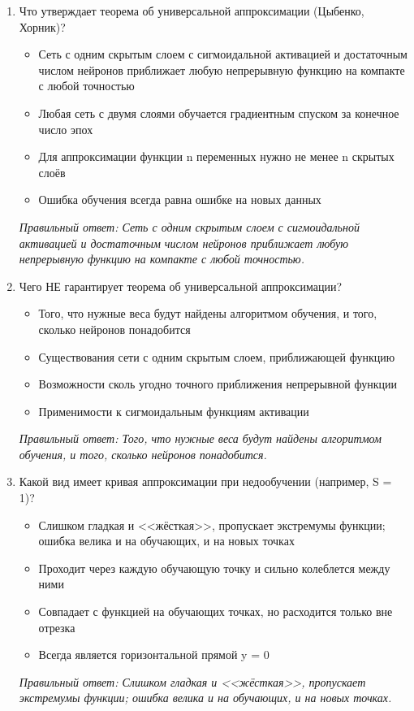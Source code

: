 \begin{enumerate}[label=\textbf{\arabic*.}, leftmargin=0pt, itemsep=1.2em]
\item Что утверждает теорема об универсальной аппроксимации (Цыбенко, Хорник)?
\begin{itemize}[label=$\square$, leftmargin=1.5cm, itemsep=0.2em, topsep=0.3em]
\item Сеть с одним скрытым слоем с сигмоидальной активацией и достаточным числом нейронов приближает любую непрерывную функцию на компакте с любой точностью
\item Любая сеть с двумя слоями обучается градиентным спуском за конечное число эпох
\item Для аппроксимации функции n переменных нужно не менее n скрытых слоёв
\item Ошибка обучения всегда равна ошибке на новых данных
\end{itemize}
{\small\textit{Правильный ответ: Сеть с одним скрытым слоем с сигмоидальной активацией и достаточным числом нейронов приближает любую непрерывную функцию на компакте с любой точностью.}}

\item Чего НЕ гарантирует теорема об универсальной аппроксимации?
\begin{itemize}[label=$\square$, leftmargin=1.5cm, itemsep=0.2em, topsep=0.3em]
\item Того, что нужные веса будут найдены алгоритмом обучения, и того, сколько нейронов понадобится
\item Существования сети с одним скрытым слоем, приближающей функцию
\item Возможности сколь угодно точного приближения непрерывной функции
\item Применимости к сигмоидальным функциям активации
\end{itemize}
{\small\textit{Правильный ответ: Того, что нужные веса будут найдены алгоритмом обучения, и того, сколько нейронов понадобится.}}

\item Какой вид имеет кривая аппроксимации при недообучении (например, S = 1)?
\begin{itemize}[label=$\square$, leftmargin=1.5cm, itemsep=0.2em, topsep=0.3em]
\item Слишком гладкая и <<жёсткая>>, пропускает экстремумы функции; ошибка велика и на обучающих, и на новых точках
\item Проходит через каждую обучающую точку и сильно колеблется между ними
\item Совпадает с функцией на обучающих точках, но расходится только вне отрезка
\item Всегда является горизонтальной прямой y = 0
\end{itemize}
{\small\textit{Правильный ответ: Слишком гладкая и <<жёсткая>>, пропускает экстремумы функции; ошибка велика и на обучающих, и на новых точках.}}


\end{enumerate}

